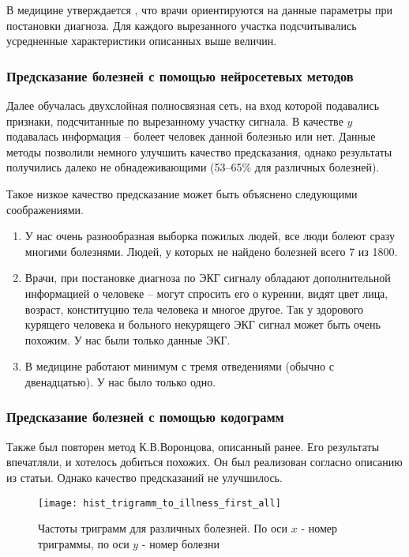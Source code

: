 В медицине утверждается \cite{p_wave, T_wave}, что врачи ориентируются на данные параметры при постановки диагноза.
Для каждого вырезанного участка подсчитывались усредненные характеристики описанных выше величин.

\subsubsection{Предсказание болезней с помощью нейросетевых методов}

Далее обучалась двухслойная полносвязная сеть, на вход которой подавались признаки, подсчитанные по вырезанному участку сигнала. В качестве $y$ подавалась информация -- болеет человек данной болезнью или нет. Данные методы позволили немного улучшить качество предсказания, однако результаты получились далеко не обнадеживающими (53--65\% для различных болезней).

Такое низкое качество предсказание может быть объяснено следующими соображениями.
\begin{enumerate}
	\item У нас очень разнообразная выборка пожилых людей, все люди болеют сразу многими болезнями. Людей, у которых не найдено болезней всего 7 из 1800.
	\item Врачи, при постановке диагноза по ЭКГ сигналу обладают дополнительной информацией о человеке -- могут спросить его о курении, видят цвет лица, возраст, конституцию тела человека и многое другое. Так у здорового курящего человека и больного некурящего ЭКГ сигнал может быть очень похожим. У нас были только данные ЭКГ.
	\item  В медицине работают минимум с тремя отведениями (обычно с двенадцатью). У нас было только одно.
\end{enumerate}

\subsubsection{Предсказание болезней с помощью кодограмм}

Также был повторен метод К.В.Воронцова, описанный ранее. Его результаты впечатляли, и хотелось добиться похожих. Он был реализован согласно описанию из статьи. Однако качество предсказаний не улучшилось. 

\begin{figure}[h!]
	\begin{center}
		\texttt{[image: hist\_trigramm\_to\_illness\_first\_all]}
		\caption{Частоты триграмм для различных болезней. По оси $x$ - номер триграммы, по оси $y$ - номер болезни}
		\label{ris:trigramm}
	\end{center}
\end{figure}

